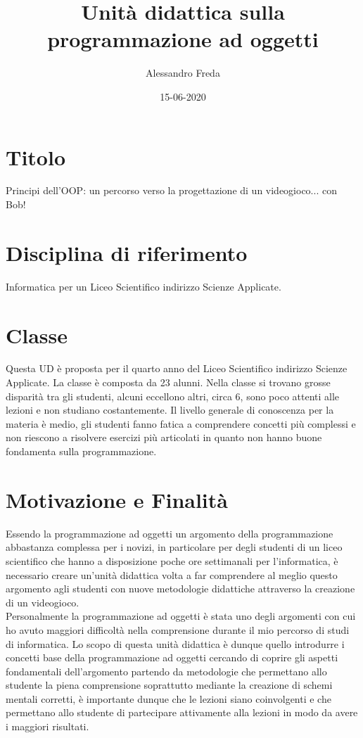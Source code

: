 \documentclass[12pt,a4paper]{article}
\title{Unità didattica sulla programmazione ad oggetti }
\author{Alessandro Freda}
\date{15-06-2020}
\begin{document}
\maketitle


\section{Titolo}\label{titolo}
Principi dell’OOP: un percorso verso la progettazione di un videogioco... con Bob!

\section{Disciplina di riferimento}\label{disciplina-di-riferimento}

Informatica per un Liceo Scientifico indirizzo Scienze Applicate.

\section{Classe}\label{classe}

Questa UD è proposta per il quarto anno del Liceo Scientifico indirizzo Scienze Applicate. La classe è composta da 23 alunni. Nella classe si trovano grosse disparità tra gli studenti, alcuni eccellono altri, circa 6, sono poco attenti alle lezioni e non studiano costantemente. Il livello generale di conoscenza per la materia è medio, gli studenti fanno fatica a comprendere concetti più complessi e non riescono a risolvere esercizi più articolati in quanto non hanno buone fondamenta sulla programmazione.

\section{Motivazione e Finalità}\label{motivazione-e-finalituxe0}

Essendo la programmazione ad oggetti un argomento della programmazione abbastanza complessa per i novizi, in particolare per degli studenti di un liceo scientifico che hanno a disposizione poche ore settimanali per l’informatica, è necessario creare un’unità didattica volta a far comprendere al meglio questo argomento agli studenti con nuove metodologie didattiche attraverso la creazione di un videogioco.\\
Personalmente la programmazione ad oggetti è stata uno degli argomenti con cui ho avuto maggiori difficoltà nella comprensione durante il mio percorso di studi di informatica. Lo scopo di questa unità didattica è dunque quello introdurre i concetti base della programmazione ad oggetti cercando di coprire gli aspetti fondamentali dell’argomento partendo da metodologie che permettano allo studente la piena comprensione soprattutto mediante la creazione di schemi mentali corretti, è importante dunque che le lezioni siano coinvolgenti e che permettano allo studente di partecipare attivamente alla lezioni in modo da avere i maggiori risultati. 
 
\end{document}
